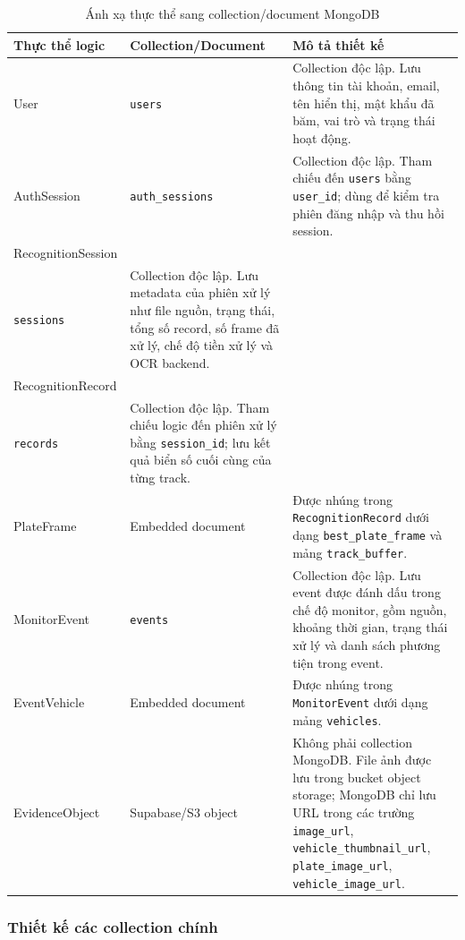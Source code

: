 \documentclass[../DoAn.tex]{subfiles}
\begin{document}
\begin{table}[H]
\centering
\caption{Ánh xạ thực thể sang collection/document MongoDB}
\label{tab:mongodb-collections}
\renewcommand{\arraystretch}{1.12}
\begin{tabular}{|>{\raggedright\arraybackslash}p{3.0cm}|>{\raggedright\arraybackslash}p{3.6cm}|>{\raggedright\arraybackslash}p{7.6cm}|}
\hline
\textbf{Thực thể logic} & \textbf{Collection/Document} & \textbf{Mô tả thiết kế} \\
\hline
User & \texttt{users} & Collection độc lập. Lưu thông tin tài khoản, email, tên hiển thị, mật khẩu đã băm, vai trò và trạng thái hoạt động. \\
\hline
AuthSession & \texttt{auth\_sessions} & Collection độc lập. Tham chiếu đến \texttt{users} bằng \texttt{user\_id}; dùng để kiểm tra phiên đăng nhập và thu hồi session. \\
\hline
RecognitionSession & \shortstack[l]{\texttt{recognition\_}\\\texttt{sessions}} & Collection độc lập. Lưu metadata của phiên xử lý như file nguồn, trạng thái, tổng số record, số frame đã xử lý, chế độ tiền xử lý và OCR backend. \\
\hline
RecognitionRecord & \shortstack[l]{\texttt{recognition\_}\\\texttt{records}} & Collection độc lập. Tham chiếu logic đến phiên xử lý bằng \texttt{session\_id}; lưu kết quả biển số cuối cùng của từng track. \\
\hline
PlateFrame & Embedded document & Được nhúng trong \texttt{RecognitionRecord} dưới dạng \texttt{best\_plate\_frame} và mảng \texttt{track\_buffer}. \\
\hline
MonitorEvent & \texttt{events} & Collection độc lập. Lưu event được đánh dấu trong chế độ monitor, gồm nguồn, khoảng thời gian, trạng thái xử lý và danh sách phương tiện trong event. \\
\hline
EventVehicle & Embedded document & Được nhúng trong \texttt{MonitorEvent} dưới dạng mảng \texttt{vehicles}. \\
\hline
EvidenceObject & Supabase/S3 object & Không phải collection MongoDB. File ảnh được lưu trong bucket object storage; MongoDB chỉ lưu URL trong các trường \texttt{image\_url}, \texttt{vehicle\_thumbnail\_url}, \texttt{plate\_image\_url}, \texttt{vehicle\_image\_url}. \\
\hline
\end{tabular}
\end{table}

\subsubsection{Thiết kế các collection chính}
\end{document}
